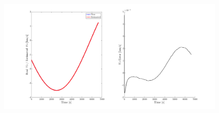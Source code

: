 \begin{figure}[H]
    \centering
    \includegraphics[width=\textwidth]{Figures/VZ_error-5observers-250km.png}
    \caption{}
    \label{fig: vzerror-250-5}
\end{figure}


